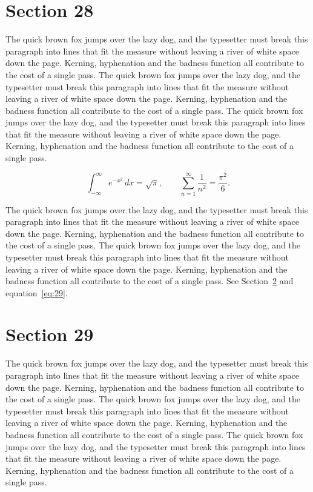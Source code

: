 \documentclass{article}
\begin{document}
\section{Section 28}
\label{sec:28}
The quick brown fox jumps over the lazy dog, and the typesetter must break this paragraph into lines that fit the measure without leaving a river of white space down the page. Kerning, hyphenation and the badness function all contribute to the cost of a single pass. The quick brown fox jumps over the lazy dog, and the typesetter must break this paragraph into lines that fit the measure without leaving a river of white space down the page. Kerning, hyphenation and the badness function all contribute to the cost of a single pass. The quick brown fox jumps over the lazy dog, and the typesetter must break this paragraph into lines that fit the measure without leaving a river of white space down the page. Kerning, hyphenation and the badness function all contribute to the cost of a single pass. 

\begin{equation}\label{eq:28}
\int_{-\infty}^{\infty} e^{-x^{2}}\,dx = \sqrt{\pi}, \qquad
\sum_{n=1}^{\infty} \frac{1}{n^{2}} = \frac{\pi^{2}}{6}.
\end{equation}

The quick brown fox jumps over the lazy dog, and the typesetter must break this paragraph into lines that fit the measure without leaving a river of white space down the page. Kerning, hyphenation and the badness function all contribute to the cost of a single pass. The quick brown fox jumps over the lazy dog, and the typesetter must break this paragraph into lines that fit the measure without leaving a river of white space down the page. Kerning, hyphenation and the badness function all contribute to the cost of a single pass. 
See Section~\ref{sec:29} and equation~\eqref{eq:29}.
\section{Section 29}
\label{sec:29}
The quick brown fox jumps over the lazy dog, and the typesetter must break this paragraph into lines that fit the measure without leaving a river of white space down the page. Kerning, hyphenation and the badness function all contribute to the cost of a single pass. The quick brown fox jumps over the lazy dog, and the typesetter must break this paragraph into lines that fit the measure without leaving a river of white space down the page. Kerning, hyphenation and the badness function all contribute to the cost of a single pass. The quick brown fox jumps over the lazy dog, and the typesetter must break this paragraph into lines that fit the measure without leaving a river of white space down the page. Kerning, hyphenation and the badness function all contribute to the cost of a single pass. 
\end{document}
